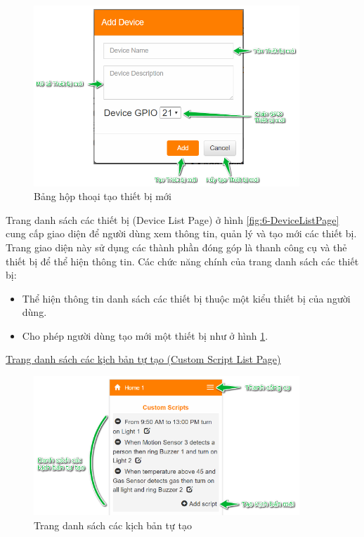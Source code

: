 \documentclass[12pt,a4paper,oneside]{extbook}
\begin{document}
\begin{figure}[h!]
  \centering
     \includegraphics[width=10cm]{6-AddDevice}
  \caption{Bảng hộp thoại tạo thiết bị mới}\label{fig:6-AddDevice}
\end{figure}

\noindent
Trang danh sách các thiết bị (Device List Page) ở hình \ref{fig:6-DeviceListPage} cung cấp giao diện để người dùng xem thông tin, quản lý và tạo mới các thiết bị. Trang giao diện này sử dụng các thành phần đóng góp là thanh công cụ và thẻ thiết bị để thể hiện thông tin. Các chức năng chính của trang danh sách các thiết bị:

\begin{itemize}[topsep=1mm,itemsep=-0.5mm]
\item Thể hiện thông tin danh sách các thiết bị thuộc một kiểu thiết bị của người dùng.
\item Cho phép người dùng tạo mới một thiết bị như ở hình \ref{fig:6-AddDevice}.
\vspace{1mm}
\end{itemize}

\noindent
\underline{Trang danh sách các kịch bản tự tạo (Custom Script List Page)}

\begin{figure}[h]
  \centering
     \includegraphics[width=10cm]{6-CustomScriptList}
  \caption{Trang danh sách các kịch bản tự tạo}\label{fig:6-CustomScriptList}
\end{figure}
\end{document}
